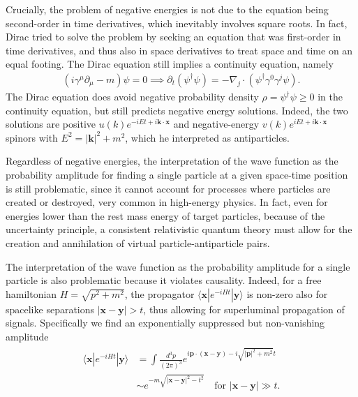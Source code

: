 \documentclass[../QFT_main.tex]{subfiles}
\begin{document}
\begin{mytheorem}
Crucially, the problem of negative energies is not due to the equation being second-order in time derivatives, which inevitably involves square roots.
In fact, Dirac tried to solve the problem by seeking an equation that was first-order in time derivatives, and thus also in space derivatives to treat space and time on an equal footing.
The Dirac equation still implies a continuity equation, namely
\begin{align}
    (i\gamma^\mu \partial_\mu - m)\psi = 0\implies \partial_t(\psi^\dagger \psi) = -\nabla_j\cdot (\psi^\dagger \gamma^0 \gamma^j \psi).
\end{align}
The Dirac equation does avoid negative probability density $\rho = \psi^\dagger \psi\geq0$ in the continuity equation, but still predicts negative energy solutions.
Indeed, the two solutions are positive $u(k)e^{-iEt+i\mathbf{k}\cdot \mathbf{x}}$ and negative-energy $v(k)e^{iEt+i\mathbf{k}\cdot \mathbf{x}}$ spinors with $E^2 = |\mathbf{k}|^2 + m^2$, which he interpreted as antiparticles.

Regardless of negative energies, the interpretation of the wave function as the probability amplitude for finding a single particle at a given space-time position is still problematic, since it cannot account for processes where particles are created or destroyed, very common in high-energy physics.
In fact, even for energies lower than the rest mass energy of target particles, because of the uncertainty principle, a consistent relativistic quantum theory must allow for the creation and annihilation of virtual particle-antiparticle pairs.

The interpretation of the wave function as the probability amplitude for a single particle is also problematic because it violates causality.
Indeed, for a free hamiltonian $H = \sqrt{p^2 + m^2}$, the propagator $\langle \mathbf{x} | e^{-iHt} | \mathbf{y} \rangle$ is non-zero also for spacelike separations $|\mathbf{x}-\mathbf{y}| > t$, thus allowing for superluminal propagation of signals.
Specifically we find an exponentially suppressed but non-vanishing amplitude 
\begin{align}\label{eq:nonvanishing_superluminal_propagation_apmplitude}
\begin{aligned}
    \langle \mathbf{x} | e^{-iHt} | \mathbf{y} \rangle &= \int \frac{d^3p}{(2\pi)^3} e^{i\mathbf{p}\cdot(\mathbf{x}-\mathbf{y}) - i\sqrt{|\mathbf{p}|^2 + m^2}t} \\
    &\sim e^{-m\sqrt{|\mathbf{x}-\mathbf{y}|^2 - t^2}} \quad \text{for } |\mathbf{x}-\mathbf{y}| \gg t.
\end{aligned}\end{align}


\end{mytheorem}
\end{document}
